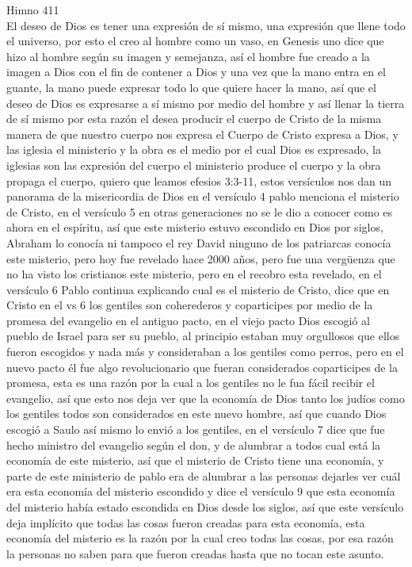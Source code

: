 \documentclass[12pt]{article}
\begin{document}
Himno 411\\

El deseo de Dios es tener una expresión de sí mismo, una expresión que llene todo el universo, por esto el creo al hombre como un vaso, en Genesis uno dice que hizo al hombre según su imagen y semejanza, así el hombre fue creado a la imagen a Dios con el fin de contener a Dios y una vez que la mano entra en el guante, la mano puede expresar todo lo que quiere hacer la mano, así que el deseo de Dios es expresarse a sí mismo por medio del hombre y así llenar la tierra de sí mismo por esta razón el desea producir el cuerpo de Cristo de la misma manera de que nuestro cuerpo nos expresa el Cuerpo de Cristo expresa a Dios, y las iglesia el ministerio y la obra es el medio por el cual Dios es expresado, la iglesias son las expresión del cuerpo el ministerio produce el cuerpo y la obra propaga el cuerpo, quiero que leamos efesios 3:3-11, estos versículos nos dan un panorama de la misericordia de Dios en el versículo 4 pablo menciona el misterio de Cristo, en el versículo 5 en otras generaciones no se le dio a conocer como es ahora en el espíritu, así que este misterio estuvo escondido en Dios por siglos, Abraham lo conocía ni tampoco el rey David ninguno de los patriarcas conocía este misterio, pero hoy fue revelado hace 2000 años, pero fue una vergüenza que no ha visto los cristianos este misterio, pero en el recobro esta revelado, en el versículo 6 Pablo continua explicando cual es el misterio de Cristo, dice que en Cristo en el vs 6 los gentiles son coherederos y coparticipes por medio de la promesa del evangelio en el antiguo pacto, en el viejo pacto Dios escogió al pueblo de Israel para ser su pueblo, al principio estaban muy orgullosos que ellos fueron escogidos y nada más y consideraban a los gentiles como perros, pero en el nuevo pacto él fue algo revolucionario que fueran considerados coparticipes de la promesa, esta es una razón por la cual a los gentiles no le fua fácil recibir el evangelio, así que esto nos deja ver que la economía de Dios tanto los judíos como los gentiles todos son considerados en este nuevo hombre, así que cuando Dios escogió a Saulo así mismo lo envió a los gentiles, en el versículo 7 dice que fue hecho ministro del evangelio según el don, y de alumbrar a todos cual está la economía de este misterio, así que el misterio de Cristo tiene una economía, y parte de este ministerio de pablo era de alumbrar a las personas dejarles ver cuál era esta economía del misterio escondido y dice el versículo 9 que esta economía del misterio había estado escondida en Dios desde los siglos, así que este versículo deja implícito que todas las cosas fueron creadas para esta economía, esta economía del misterio es la razón por la cual creo todas las cosas, por esa razón la personas no saben para que fueron creadas hasta que no tocan este asunto.\\
\end{document}

